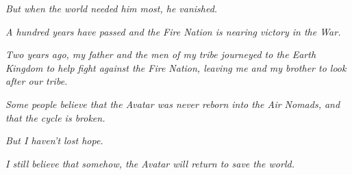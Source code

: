 \documentclass[10pt]{article}
\begin{document}
\textit{But when the world needed him most, he vanished.}

\textit{A hundred years have passed and the Fire Nation is nearing victory in the War.}

\textit{Two years ago, my father and the men of my tribe journeyed to the Earth Kingdom to help fight against the Fire Nation, leaving me and my brother to look after our tribe.}

\textit{Some people believe that the Avatar was never reborn into the Air Nomads, and that the cycle is broken.}

\textit{But I haven't lost hope.}

\textit{I still believe that somehow, the Avatar will return to save the world.}
\newpage

\begin{multicols*}{2}











\end{multicols*}
\end{document}
